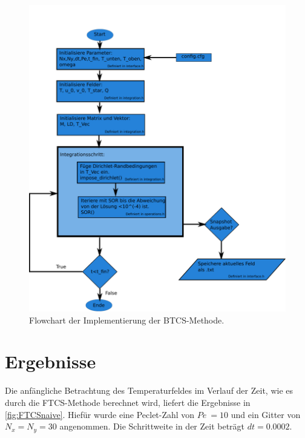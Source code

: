\begin{figure}\centering
\includegraphics[width=0.4\textheight]{BTCSflow.pdf}\caption{Flowchart der Implementierung der BTCS-Methode.}\label{fig:BTCS}
\end{figure}

\section{Ergebnisse}
Die anfängliche Betrachtung des Temperaturfeldes im Verlauf der Zeit, wie es durch die FTCS-Methode berechnet wird, liefert die Ergebnisse in \cref{fig:FTCSnaive}. Hiefür wurde eine Peclet-Zahl von $Pe~=10$ und ein Gitter von $N_x=N_y=30$ angenommen. Die Schrittweite in der Zeit beträgt $dt=0.0002$.

